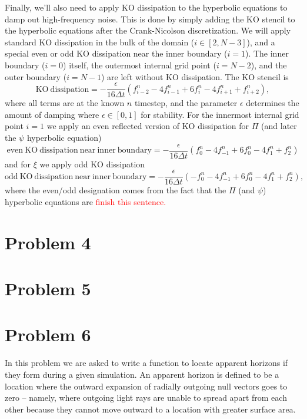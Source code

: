 \documentclass[12pt]{article}
\numberwithin{equation}{section}
\newcommand{\redtext}[1]{\textcolor{red}{#1}}
\begin{document}
Finally, we'll also need to apply KO dissipation to the hyperbolic equations to damp out high-frequency noise.  This is done by simply adding the KO stencil to the hyperbolic equations after the Crank-Nicolson discretization.  We will apply standard KO dissipation in the bulk of the domain ($i \in [2, N-3]$), and a special even or odd KO dissipation near the inner boundary ($i = 1$).  The inner boundary ($i=0$) itself, the outermost internal grid point ($i = N-2$), and the outer boundary ($i = N-1$) are left without KO dissipation.  The KO stencil is
\begin{equation}
\mathrm{KO~dissipation} = -\frac{\epsilon}{16 \Delta t} (f^{n}_{i-2} - 4 f^{n}_{i-1} + 6 f^{n}_{i} - 4 f^{n}_{i+1} + f^{n}_{i+2}),
\end{equation}
where all terms are at the known $n$ timestep, and the parameter $\epsilon$ determines the amount of damping where $\epsilon \in [0, 1]$ for stability.  For the innermost internal grid point $i = 1$ we apply an even reflected version of KO dissipation for $\Pi$ (and later the $\psi$ hyperbolic equation)
\begin{equation}
\mathrm{even~KO~dissipation~near~inner~boundary} = -\frac{\epsilon}{16 \Delta t} (f^{n}_{0} - 4 f^{n}_{-1} + 6 f^{n}_{0} - 4 f^{n}_{1} + f^{n}_{2})
\end{equation}
and for $\xi$ we apply odd KO dissipation
\begin{equation}
\mathrm{odd~KO~dissipation~near~inner~boundary} = -\frac{\epsilon}{16 \Delta t} (-f^{n}_{0} - 4 f^{n}_{-1} + 6 f^{n}_{0} - 4 f^{n}_{1} + f^{n}_{2}),
\end{equation}
where the even/odd designation comes from the fact that the $\Pi$ (and $\psi$) hyperbolic equations are \redtext{finish this sentence.}

\section{Problem 4}

\section{Problem 5}

\section{Problem 6}
In this problem we are asked to write a function to locate apparent horizons if they form during a given simulation.  An apparent horizon is defined to be a location where the outward expansion of radially outgoing null vectors goes to zero -- namely, where outgoing light rays are unable to spread apart from each other because they cannot move outward to a location with greater surface area.  
\end{document}

